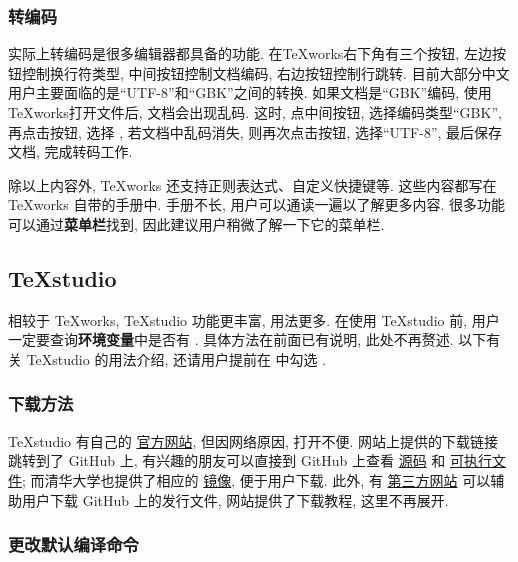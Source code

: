 \subsubsection{转编码}

实际上转编码是很多编辑器都具备的功能.
在\TeX works右下角有三个按钮,
左边按钮控制换行符类型, 中间按钮控制文档编码, 右边按钮控制行跳转.
目前大部分中文用户主要面临的是``UTF-8''和``GBK''之间的转换.
如果文档是``GBK''编码, 使用\TeX works打开文件后, 文档会出现乱码.
这时, 点中间按钮, 选择编码类型``GBK'', 再点击按钮,
选择 , 若文档中乱码消失, 则再次点击按钮,
选择``UTF-8'', 最后保存文档, 完成转码工作.

除以上内容外, \TeX works 还支持正则表达式、自定义快捷键等.
这些内容都写在 \TeX works 自带的手册中.
手册不长, 用户可以通读一遍以了解更多内容.
很多功能可以通过\textbf{菜单栏}找到,
因此建议用户稍微了解一下它的菜单栏.

\subsection{\TeX studio}\label{subsec:texstudio}

相较于 \TeX works, \TeX studio 功能更丰富, 用法更多.
在使用 \TeX studio 前,
用户一定要查询\textbf{环境变量}中是否有 .
具体方法在前面已有说明, 此处不再赘述.
以下有关 \TeX studio 的用法介绍,
还请用户提前在  中勾选
.

\subsubsection{下载方法}

\TeX studio 有自己的%
\href{http://texstudio.sourceforge.net/}{官方网站},
但因网络原因,
打开不便.
网站上提供的下载链接跳转到了 GitHub 上,
有兴趣的朋友可以直接到 GitHub 上查看%
\href{https://github.com/texstudio-org/texstudio}{源码}%
和%
\href{https://github.com/texstudio-org/texstudio/releases}{可执行文件};
而清华大学也提供了相应的%
\href{https://mirrors.tuna.tsinghua.edu.cn/github-release/texstudio-org/texstudio/LatestRelease/}{镜像},
便于用户下载.
此外,
有%
\href{https://d.serctl.com/}{第三方网站}%
可以辅助用户下载 GitHub 上的发行文件,
网站提供了下载教程,
这里不再展开.

\subsubsection{更改默认编译命令}

